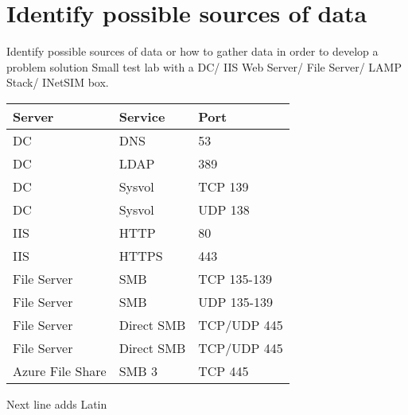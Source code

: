 \documentclass[12pt]{report}
\begin{document}
\section*{Identify possible sources of data}
Identify possible sources of data or how to gather data in order to develop a problem solution
\newline
Small test lab with a DC/ IIS Web Server/ File Server/ LAMP Stack/ INetSIM box.
\newline
\newline
\maketitle
\begin{tabular}{|l|l|l|}
\hline
\textbf{Server} & \textbf{Service} & \textbf{Port}\\
\hline
DC & DNS & 53\\
\hline
DC & LDAP & 389\\
\hline
DC & Sysvol & TCP 139\\
\hline
DC & Sysvol & UDP 138\\
\hline
IIS & HTTP & 80\\
\hline
IIS & HTTPS & 443\\
\hline
File Server & SMB & TCP 135-139\\
\hline
File Server & SMB & UDP 135-139\\
\hline
File Server & Direct SMB & TCP/UDP 445\\
\hline
File Server & Direct SMB & TCP/UDP 445\\
\hline
Azure File Share & SMB 3 & TCP 445\\
\hline
\end{tabular}
\newline
\newline
Next line adds Latin
\newline
\newline
\newpage
\end{document}
